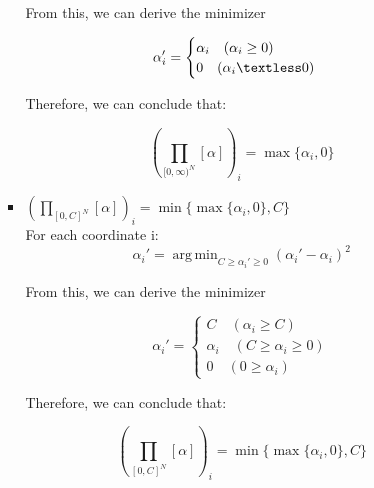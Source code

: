 \documentclass{article}
\DeclareMathOperator*{\argmin}{arg\,min}
\theoremstyle{definition}
\theoremstyle{remark}
\begin{document}
\begin{enumerate}[font={\Large\bfseries},left=0pt]
\begin{tcolorbox}
\begin{enumerate}
\begin{itemize}
				            From this, we can derive the minimizer

				            $$
					            \alpha_i'
					            =
					            \begin{cases}
						            \alpha_i \quad (\alpha_i \ge 0) \\
						            0 \quad (\alpha_i \textless 0)
					            \end{cases}
				            $$

				            Therefore, we can conclude that:

				            $$
					            \left(\prod_{[0, \infty)^N}[\alpha]\right)_i = \max\{\alpha_i, 0\}
				            $$

				      \item $\left(\prod_{[0, C]^N}[\alpha]\right)_i = \min\{\max\{\alpha_i, 0\}, C\}$ \\
				            For each coordinate i:
				            $$
					            \alpha_i' = \argmin_{C \ge \alpha_i' \ge 0} (\alpha_i' - \alpha_i)^2
				            $$

				            From this, we can derive the minimizer

				            $$
					            \alpha_i'
					            =
					            \begin{cases}
						            C \quad (\alpha_i \ge C)              \\
						            \alpha_i \quad (C \ge \alpha_i \ge 0) \\
						            0 \quad (0 \ge \alpha_i)
					            \end{cases}
				            $$

				            Therefore, we can conclude that:

				            $$
					            \left(\prod_{[0, C]^N}[\alpha]\right)_i = \min\{\max\{\alpha_i, 0\}, C\}
				            $$





			      \end{itemize}
		\end{enumerate}
	\end{tcolorbox}


\end{enumerate}
\end{document}
